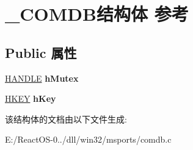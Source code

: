 \hypertarget{struct___c_o_m_d_b}{}\section{\+\_\+\+C\+O\+M\+D\+B结构体 参考}
\label{struct___c_o_m_d_b}
\subsection*{Public 属性}
\begin{DoxyCompactItemize}
\item 
\mbox{\label{struct___c_o_m_d_b_ab7184081f333d5bafa55c1b0de719624}} 
\hyperlink{interfacevoid}{H\+A\+N\+D\+LE} {\bfseries h\+Mutex}
\item 
\mbox{\label{struct___c_o_m_d_b_a9eeb11aa9d609d2cec4a6fd12fed3ba7}} 
\hyperlink{interfacevoid}{H\+K\+EY} {\bfseries h\+Key}
\end{DoxyCompactItemize}


该结构体的文档由以下文件生成\+:\begin{DoxyCompactItemize}
\item 
E\+:/\+React\+O\+S-\/0../dll/win32/msports/comdb.\+c\end{DoxyCompactItemize}
